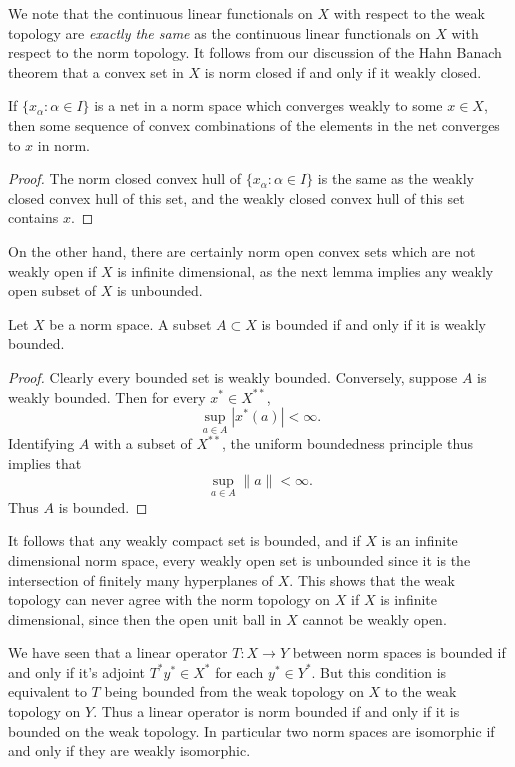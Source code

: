 We note that the continuous linear functionals on $X$ with respect to the weak topology are \emph{exactly the same} as the continuous linear functionals on $X$ with respect to the norm topology. It follows from our discussion of the Hahn Banach theorem that a convex set in $X$ is norm closed if and only if it weakly closed.

\begin{theorem}
    If $\{ x_\alpha : \alpha \in I \}$ is a net in a norm space which converges weakly to some $x \in X$, then some sequence of convex combinations of the elements in the net converges to $x$ in norm.
\end{theorem}
\begin{proof}
    The norm closed convex hull of $\{ x_\alpha : \alpha \in I \}$ is the same as the weakly closed convex hull of this set, and the weakly closed convex hull of this set contains $x$.
\end{proof}

On the other hand, there are certainly norm open convex sets which are not weakly open if $X$ is infinite dimensional, as the next lemma implies any weakly open subset of $X$ is unbounded.

\begin{theorem}
    Let $X$ be a norm space. A subset $A \subset X$ is bounded if and only if it is weakly bounded.
\end{theorem}
\begin{proof}
    Clearly every bounded set is weakly bounded. Conversely, suppose $A$ is weakly bounded. Then for every $x^* \in X^{**}$,
    \[ \sup_{a \in A} |x^*(a)| < \infty. \]
    Identifying $A$ with a subset of $X^{**}$, the uniform boundedness principle thus implies that
    \[ \sup_{a \in A} \| a \| < \infty. \]
    Thus $A$ is bounded.
\end{proof}

It follows that any weakly compact set is bounded, and if $X$ is an infinite dimensional norm space, every weakly open set is unbounded since it is the intersection of finitely many hyperplanes of $X$. This shows that the weak topology can never agree with the norm topology on $X$ if $X$ is infinite dimensional, since then the open unit ball in $X$ cannot be weakly open.

We have seen that a linear operator $T: X \to Y$ between norm spaces is bounded if and only if it's adjoint $T^* y^* \in X^*$ for each $y^* \in Y^*$. But this condition is equivalent to $T$ being bounded from the weak topology on $X$ to the weak topology on $Y$. Thus a linear operator is norm bounded if and only if it is bounded on the weak topology. In particular two norm spaces are isomorphic if and only if they are weakly isomorphic.


